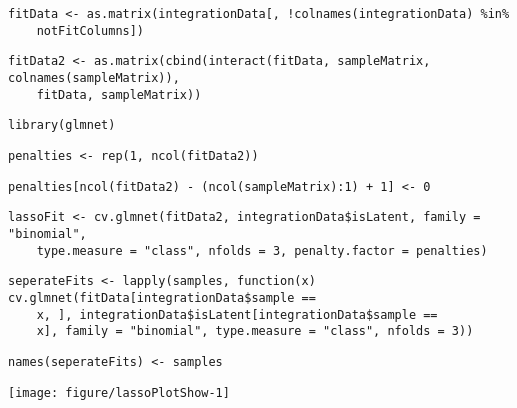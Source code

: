 \documentclass[../../sherrill-Mix_thesis.tex]{subfiles}
\makeatletter
\def\maxwidth{ %
  \ifdim\Gin@nat@width>\linewidth
    \linewidth
  \else
    \Gin@nat@width
  \fi
}
\newenvironment{kframe}{%
 \def\at@end@of@kframe{}%
 \ifinner\ifhmode%
  \def\at@end@of@kframe{\end{minipage}}%
  \begin{minipage}{\columnwidth}%
 \fi\fi%
 \def\FrameCommand##1{\hskip\@totalleftmargin \hskip-\fboxsep
 \colorbox{shadecolor}{##1}\hskip-\fboxsep
     \hskip-\linewidth \hskip-\@totalleftmargin \hskip\columnwidth}%
 \MakeFramed {\advance\hsize-\width
   \@totalleftmargin\z@ \linewidth\hsize
   \@setminipage}}%
 {\par\unskip\endMakeFramed%
 \at@end@of@kframe}
\newenvironment{knitrout}{}{} %
\makeatother
\begin{document}
\begin{center}
\begin{knitrout}
\begin{kframe}
\begin{lstlisting}[basicstyle=\ttfamily,breaklines=true]
\end{lstlisting}
\begin{lstlisting}[basicstyle=\ttfamily,breaklines=true]
fitData <- as.matrix(integrationData[, !colnames(integrationData) %in% 
    notFitColumns])\end{lstlisting}
\begin{lstlisting}[basicstyle=\ttfamily,breaklines=true]
fitData2 <- as.matrix(cbind(interact(fitData, sampleMatrix, colnames(sampleMatrix)), 
    fitData, sampleMatrix))\end{lstlisting}
\end{kframe}
\end{knitrout}

\begin{knitrout}
\color{fgcolor}\begin{kframe}
\begin{lstlisting}[basicstyle=\ttfamily,breaklines=true]
library(glmnet)\end{lstlisting}
\begin{lstlisting}[basicstyle=\ttfamily,breaklines=true]
penalties <- rep(1, ncol(fitData2))\end{lstlisting}
\begin{lstlisting}[basicstyle=\ttfamily,breaklines=true]
penalties[ncol(fitData2) - (ncol(sampleMatrix):1) + 1] <- 0\end{lstlisting}
\begin{lstlisting}[basicstyle=\ttfamily,breaklines=true]
lassoFit <- cv.glmnet(fitData2, integrationData$isLatent, family = "binomial", 
    type.measure = "class", nfolds = 3, penalty.factor = penalties)\end{lstlisting}
\begin{lstlisting}[basicstyle=\ttfamily,breaklines=true]
seperateFits <- lapply(samples, function(x) cv.glmnet(fitData[integrationData$sample == 
    x, ], integrationData$isLatent[integrationData$sample == 
    x], family = "binomial", type.measure = "class", nfolds = 3))\end{lstlisting}
\begin{lstlisting}[basicstyle=\ttfamily,breaklines=true]
names(seperateFits) <- samples\end{lstlisting}
\end{kframe}
\end{knitrout}

\begin{knitrout}
\color{fgcolor}
\texttt{[image: figure/lassoPlotShow-1]} 

\end{knitrout}


\end{center}
\end{document}
